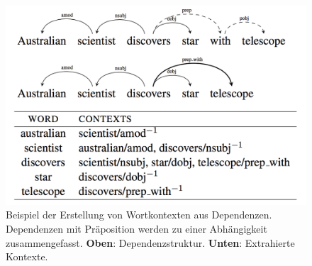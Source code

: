 \begin{figure}[h]
    \centering
    \includegraphics[scale=0.2]{../img/depend_ex.png}
    \caption[Erstellung von Dependenzkontexten beim Wortvektortraining]{Beispiel der Erstellung von Wortkontexten aus Dependenzen.
    Dependenzen mit Präposition werden zu einer Abhängigkeit zusammengefasst. \textbf{Oben}: Dependenzstruktur.
    \textbf{Unten}: Extrahierte Kontexte.}
\end{figure}
